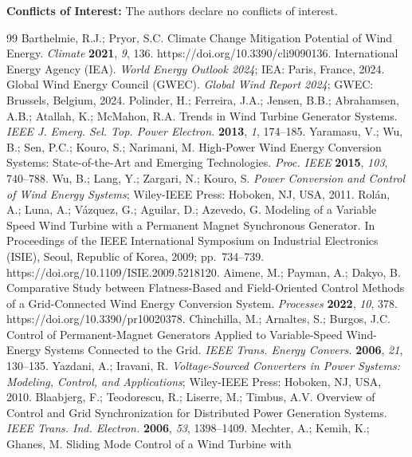 \documentclass[11pt,a4paper]{article}
\begin{document}
\noindent\textbf{Conflicts of Interest:} The authors declare no conflicts of interest.
\normalsize

\begin{thebibliography}{99}
\small
{} Barthelmie, R.J.; Pryor, S.C. Climate Change Mitigation Potential of Wind Energy.
\emph{Climate} \textbf{2021}, \emph{9}, 136. https://doi.org/10.3390/cli9090136.
 International Energy Agency (IEA). \emph{World Energy Outlook 2024}; IEA: Paris, France, 2024.
 Global Wind Energy Council (GWEC). \emph{Global Wind Report 2024}; GWEC: Brussels,
Belgium, 2024.
 Polinder, H.; Ferreira, J.A.; Jensen, B.B.; Abrahamsen, A.B.; Atallah, K.;
McMahon, R.A. Trends in Wind Turbine Generator Systems. \emph{IEEE J. Emerg. Sel. Top. Power Electron.}
\textbf{2013}, \emph{1}, 174--185.
 Yaramasu, V.; Wu, B.; Sen, P.C.; Kouro, S.; Narimani, M. High-Power Wind Energy
Conversion Systems: State-of-the-Art and Emerging Technologies. \emph{Proc. IEEE} \textbf{2015},
\emph{103}, 740--788.
 Wu, B.; Lang, Y.; Zargari, N.; Kouro, S. \emph{Power Conversion and Control of Wind
Energy Systems}; Wiley-IEEE Press: Hoboken, NJ, USA, 2011.
 Rol\'an, A.; Luna, A.; V\'azquez, G.; Aguilar, D.; Azevedo, G. Modeling of a
Variable Speed Wind Turbine with a Permanent Magnet Synchronous Generator. In Proceedings of the IEEE
International Symposium on Industrial Electronics (ISIE), Seoul, Republic of Korea, 2009; pp.~734--739.
https://doi.org/10.1109/ISIE.2009.5218120.
 Aimene, M.; Payman, A.; Dakyo, B. Comparative Study between Flatness-Based and
Field-Oriented Control Methods of a Grid-Connected Wind Energy Conversion System. \emph{Processes}
\textbf{2022}, \emph{10}, 378. https://doi.org/10.3390/pr10020378.
 Chinchilla, M.; Arnaltes, S.; Burgos, J.C. Control of Permanent-Magnet
Generators Applied to Variable-Speed Wind-Energy Systems Connected to the Grid. \emph{IEEE Trans. Energy
Convers.} \textbf{2006}, \emph{21}, 130--135.
 Yazdani, A.; Iravani, R. \emph{Voltage-Sourced Converters in Power Systems:
Modeling, Control, and Applications}; Wiley-IEEE Press: Hoboken, NJ, USA, 2010.
 Blaabjerg, F.; Teodorescu, R.; Liserre, M.; Timbus, A.V. Overview of Control and
Grid Synchronization for Distributed Power Generation Systems. \emph{IEEE Trans. Ind. Electron.}
\textbf{2006}, \emph{53}, 1398--1409.
 Mechter, A.; Kemih, K.; Ghanes, M. Sliding Mode Control of a Wind Turbine with

\end{thebibliography}
\end{document}
